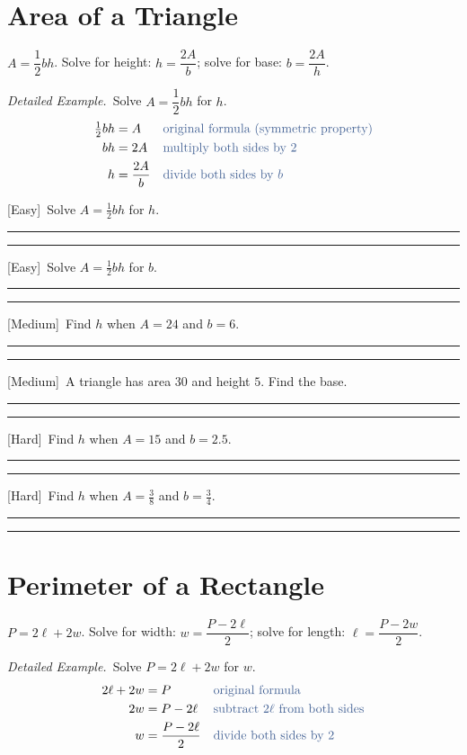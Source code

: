 \documentclass[11pt]{article}
\newcommand{\E}{\textcolor{levE}{\small[Easy]}\ }
\newcommand{\M}{\textcolor{levM}{\small[Medium]}\ }
\newcommand{\Hd}{\textcolor{levH}{\small[Hard]}\ }
\newcommand{\example}{\textit{\textcolor{fangblue}{Detailed Example.}}\ }
\newcommand{\twolines}{\par\vspace{0.7cm}%
  \textcolor{gray!55}{\rule{\linewidth}{0.3pt}}\par\vspace{0.7cm}%
  \textcolor{gray!55}{\rule{\linewidth}{0.3pt}}\par\vspace{2mm}}
\begin{document}
\section{Area of a Triangle}
\begin{keybox}
$A = \dfrac12 b h$. \quad Solve for height: $h = \dfrac{2A}{b}$; \quad solve for base: $b = \dfrac{2A}{h}$.
\end{keybox}

\example Solve $A = \dfrac12 bh$ for $h$.
\begin{align*}
\tfrac12 b h &= A &&\color{reasonclr}\text{original formula (symmetric property)}\\
b h &= 2A &&\color{reasonclr}\text{multiply both sides by } 2\\
h &= \frac{2A}{b} &&\color{reasonclr}\text{divide both sides by } b
\end{align*}

\begin{prob}
\item \E Solve $A = \tfrac12 bh$ for $h$. \twolines
\item \E Solve $A = \tfrac12 bh$ for $b$. \twolines
\item \M Find $h$ when $A = 24$ and $b = 6$. \twolines
\item \M A triangle has area $30$ and height $5$. Find the base. \twolines
\item \Hd Find $h$ when $A = 15$ and $b = 2.5$. \twolines
\item \Hd Find $h$ when $A = \tfrac38$ and $b = \tfrac34$. \twolines
\end{prob}

\section{Perimeter of a Rectangle}
\begin{keybox}
$P = 2\ell + 2w$. \quad Solve for width: $w = \dfrac{P - 2\ell}{2}$; \quad
solve for length: $\ell = \dfrac{P - 2w}{2}$.
\end{keybox}

\example Solve $P = 2\ell + 2w$ for $w$.
\begin{align*}
2\ell + 2w &= P &&\color{reasonclr}\text{original formula}\\
2w &= P - 2\ell &&\color{reasonclr}\text{subtract } 2\ell \text{ from both sides}\\
w &= \frac{P - 2\ell}{2} &&\color{reasonclr}\text{divide both sides by } 2
\end{align*}
\end{document}
